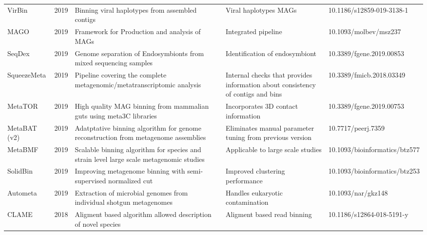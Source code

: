 \begin{tabular}{p{2cm}|p{0.6cm}|p{4cm}|p{4cm}|p{3.4cm}}
            VirBin &  2019 &                                            Binning viral haplotypes from assembled contigs &                                                            Viral haplotypes MAGs &       10.1186/s12859-019-3138-1 \\
              MAGO &  2019 &                                              Framework for Production and analysis of MAGs &                                                              Integrated pipeline &           10.1093/molbev/msz237 \\
            SeqDex &  2019 &                           Genome separation of Endosymbionts from mixed sequencing samples &                                                   Identification of endosymbiont &        10.3389/fgene.2019.00853 \\
       SqueezeMeta &  2019 &                     Pipeline covering the complete metagenomic/metatranscriptomic analysis &  Internal checks that provides information about consistency of contigs and bins &        10.3389/fmicb.2018.03349 \\
           MetaTOR &  2019 &                        High quality MAG binning from mammalian guts using meta3C libraries &                                              Incorporates 3D contact information &        10.3389/fgene.2019.00753 \\
      MetaBAT (v2) &  2019 &         Adatptative binning algorithm for genome reconstruction from metagenome assemblies &                         Eliminates manual parameter tuning from previous version &              10.7717/peerj.7359 \\
           MetaBMF &  2019 &    Scalable binning algorithm for species and strain level large scale metagenomic studies &                                                Applicable to large scale studies &   10.1093/bioinformatics/btz577 \\
          SolidBin &  2019 &                           Improving metagenome binning with semi-supervised normalized cut &                                                  Improved clustering performance &   10.1093/bioinformatics/btz253 \\
          Autometa &  2019 &                        Extraction of microbial genomes from individual shotgun metagenomes &                                                 Handles eukaryotic contamination &              10.1093/nar/gkz148 \\
             CLAME &  2018 &                              Aligment based algorithm allowed description of novel species &                                                      Aligment based read binning &       10.1186/s12864-018-5191-y \\

\end{tabular}
